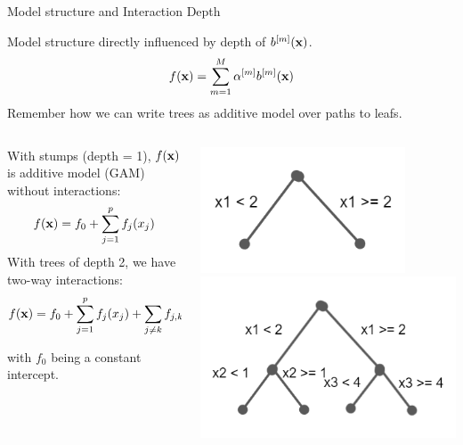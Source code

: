 \documentclass[11pt,compress,t,notes=noshow, xcolor=table]{beamer}
\begin{document}
\begin{vbframe}{Model structure and Interaction Depth}

\begin{footnotesize}
Model structure directly influenced by depth of $b^{[m]}(\mathbf{x})$.
$$
f(\mathbf{x}) =  \sum_{m=1}^M \alpha^{[m]} b^{[m]}(\mathbf{x})
$$
Remember how we can write trees as additive model over paths to leafs.

\lz
\begin{columns}[T]
\begin{column}{0.6\textwidth}
With stumps (depth = 1), $f(\mathbf{x})$ is additive model (GAM) without interactions:\\
$$
f(\mathbf{x}) = f_0 + \sum_{j=1}^p f_j(x_j)
$$
With trees of depth 2, we have two-way interactions:\\
$$
f(\mathbf{x}) = f_0 + \sum_{j=1}^p f_j(x_j) + \sum_{j \neq k} f_{j,k}(x_j, x_k)
$$

with $f_0$ being a constant intercept.
\end{column}
\begin{column}{0.4\textwidth}
\includegraphics[width=0.8\textwidth]{figure_man/boosting_interact_expl1.PNG}
\includegraphics[width=\textwidth]{figure_man/boosting_interact_expl2.PNG}
\end{column}
\end{columns}
\end{footnotesize}


\end{vbframe}
\end{document}
